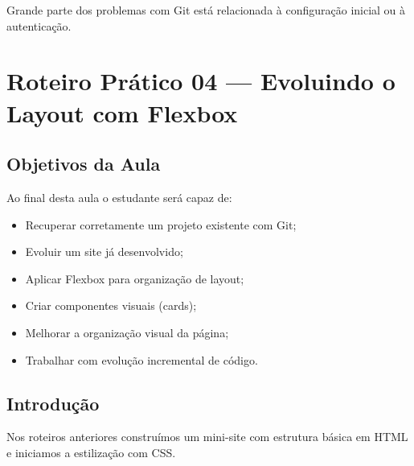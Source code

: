 \documentclass[12pt,a4paper]{article}
\begin{document}
Grande parte dos problemas com Git está relacionada à configuração inicial ou à autenticação.









    \newpage



\section{Roteiro Prático 04 — Evoluindo o Layout com Flexbox}


\subsection{Objetivos da Aula}

\begin{boxObjetivos}
Ao final desta aula o estudante será capaz de:

\begin{itemize}
\item Recuperar corretamente um projeto existente com Git;
\item Evoluir um site já desenvolvido;
\item Aplicar Flexbox para organização de layout;
\item Criar componentes visuais (cards);
\item Melhorar a organização visual da página;
\item Trabalhar com evolução incremental de código.
\end{itemize}
\end{boxObjetivos}


\subsection{Introdução}

Nos roteiros anteriores construímos um mini-site com estrutura básica em HTML e iniciamos a estilização com CSS.
\end{document}
